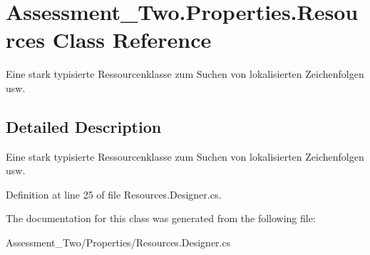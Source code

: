 \hypertarget{class_assessment___two_1_1_properties_1_1_resources}{
\section{Assessment\_\-Two.Properties.Resources Class Reference}
\label{class_assessment___two_1_1_properties_1_1_resources}
}


Eine stark typisierte Ressourcenklasse zum Suchen von lokalisierten Zeichenfolgen usw.  




\subsection{Detailed Description}
Eine stark typisierte Ressourcenklasse zum Suchen von lokalisierten Zeichenfolgen usw. 

Definition at line 25 of file Resources.Designer.cs.



The documentation for this class was generated from the following file:\begin{DoxyCompactItemize}
\item 
Assessment\_\-Two/Properties/Resources.Designer.cs\end{DoxyCompactItemize}
